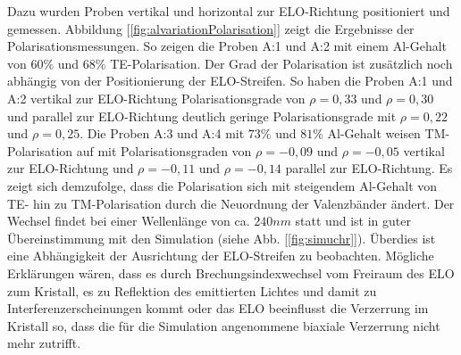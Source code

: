 %
Dazu wurden Proben vertikal und horizontal zur ELO-Richtung positioniert und gemessen. Abbildung [\ref{fig:alvariationPolarisation}] zeigt die Ergebnisse der Polarisationsmessungen. So zeigen die Proben A:1 und A:2 mit einem Al-Gehalt von $60\%$ und $68\%$ TE-Polarisation. Der Grad der Polarisation ist zus\"atzlich noch abh\"angig von der Positionierung der ELO-Streifen. So haben die Proben A:1 und A:2 vertikal zur ELO-Richtung Polarisationsgrade von $\rho = 0,33$ und $\rho = 0,30$ und parallel zur ELO-Richtung deutlich geringe Polarisationsgrade mit $\rho = 0,22$ und $\rho = 0,25$. Die Proben A:3 und A:4 mit $73\%$ und $81\%$ Al-Gehalt weisen TM-Polarisation auf mit Polarisationsgraden von $\rho = -0,09$ und $\rho = -0,05$ vertikal zur ELO-Richtung und $\rho = -0,11$ und $\rho = -0,14$ parallel zur ELO-Richtung. Es zeigt sich demzufolge, dass die Polarisation sich mit steigendem Al-Gehalt von TE- hin zu TM-Polarisation durch die Neuordnung der Valenzb\"ander \"andert. Der Wechsel findet bei einer Wellenl\"ange von ca. $240nm$ statt und ist in guter \"Ubereinstimmung mit den Simulation (siehe Abb. [\ref{fig:simuchr}]). \"Uberdies ist eine Abh\"angigkeit der Ausrichtung der ELO-Streifen zu beobachten. M\"ogliche Erkl\"arungen w\"aren, dass es durch Brechungsindexwechsel vom Freiraum des ELO zum Kristall, es zu Reflektion des emittierten Lichtes und damit zu Interferenzerscheinungen kommt oder das ELO beeinflusst die Verzerrung im Kristall so, dass die f\"ur die Simulation angenommene biaxiale Verzerrung nicht mehr zutrifft. 

